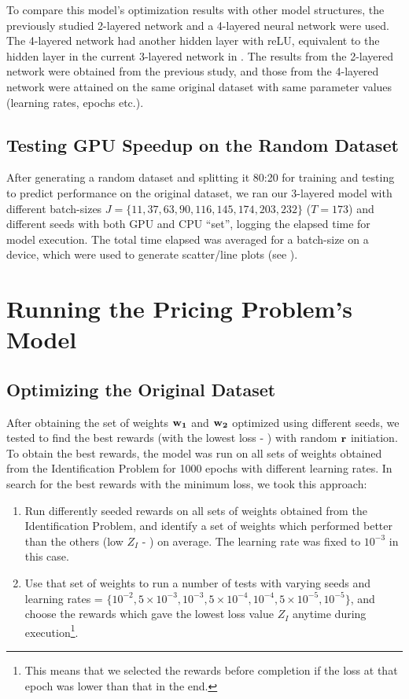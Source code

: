 To compare this model's optimization results with other model structures, the previously studied 2-layered network \cite{Xue2016Avi2} and a 4-layered neural network were used. The 4-layered network had another hidden layer with reLU, equivalent to the hidden layer in the current 3-layered network in . The results from the 2-layered network were obtained from the previous study, and those from the 4-layered network were attained on the same original dataset with same parameter values (learning rates, epochs etc.).

\subsection{Testing GPU Speedup on the Random Dataset} \label{sec:Identification Problem-Testing GPU Speedup on the Random Dataset}
After generating a random dataset and splitting it 80:20 for training and testing to predict performance on the original dataset, we ran our 3-layered model with different batch-sizes $J = \{11,37,63,90,116,145,174,203,232\}$ ($T = 173$) and different seeds with both GPU and CPU ``set'', logging the elapsed time for model execution. The total time elapsed was averaged for a batch-size on a device, which were used to generate scatter/line plots (see ).

\section{Running the Pricing Problem's Model} \label{sec:Running the Pricing Problem's Model}
\subsection{Optimizing the Original Dataset} \label{sec:Pricing Problem-Optimizing the Original Dataset}
After obtaining the set of weights $\mathbf{w_1}$ and $\mathbf{w_2}$ optimized using different seeds, we tested to find the best rewards (with the lowest loss - ) with random $\mathbf{r}$ initiation. To obtain the best rewards, the model was run on all sets of weights obtained from the Identification Problem for 1000 epochs with different learning rates. In search for the best rewards with the minimum loss, we took this approach:
\begin{enumerate}
    \item Run differently seeded rewards on all sets of weights obtained from the Identification Problem, and identify a set of weights which performed better than the others (low $Z_I$ - ) on average. The learning rate was fixed to $10^{-3}$ in this case.
    \item Use that set of weights to run a number of tests with varying seeds and learning rates = $\{10^{-2}, 5 \times 10^{-3}, 10^{-3}, 5 \times 10^{-4}, 10^{-4}, 5 \times 10^{-5}, 10^{-5}\}$, and choose the rewards which gave the lowest loss value $Z_I$ anytime during execution\footnote{This means that we selected the rewards before completion if the loss at that epoch was lower than that in the end.}. 
\end{enumerate}

